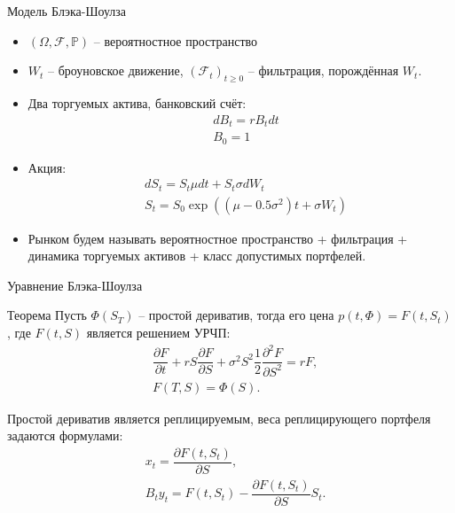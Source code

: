 \documentclass[aspectratio=169]{beamer}
\begin{document}
\begin{frame}{Модель Блэка-Шоулза}
    \begin{itemize}
        \item $(\Omega, \mathcal{F}, \mathbb{P})$ -- вероятностное пространство
        \item $W_t$ -- броуновское движение, 
    $(\mathcal{F}_t)_{t\geq 0}$ -- фильтрация, порождённая $W_t$.
        \item Два торгуемых актива, банковский счёт:
        \begin{align*}
            &dB_t = r B_t dt \\
            &B_0 = 1
        \end{align*}
        \item Акция:
    \begin{align*}
        &dS_t = S_t \mu dt + S_t \sigma dW_t \\
        &S_t = S_0 \exp\left( \left(\mu - 0.5 \sigma^2 \right) t + \sigma W_t \right)
    \end{align*}
    \item Рынком будем называть вероятностное пространство + фильтрация + динамика торгуемых активов + класс допустимых портфелей.
    \end{itemize}
\end{frame}

\begin{frame}{Уравнение Блэка-Шоулза}
    \begin{block}{Теорема}
        Пусть $\Phi(S_T)$ -- простой дериватив, тогда его цена $p(t, \Phi) = F(t, S_t)$, где $F(t, S)$ является решением УРЧП:
        \begin{align*}
            &\dfrac{\partial F}{\partial t} + r S \dfrac{\partial F}{\partial S} + \sigma^2 S^2 \dfrac{1}{2}\dfrac{\partial^2 F}{\partial S^2} = r F ,\\
            &F(T, S) = \Phi(S).
        \end{align*}
    \end{block}
    Простой дериватив является реплицируемым, веса реплицирующего портфеля задаются формулами:
    \begin{align*}
        &x_t = \dfrac{\partial F(t, S_t)}{\partial S},\\
        &B_t y_t = F(t, S_t) - \dfrac{\partial F(t, S_t)}{\partial S} S_t.
    \end{align*}
\end{frame}
\end{document}
